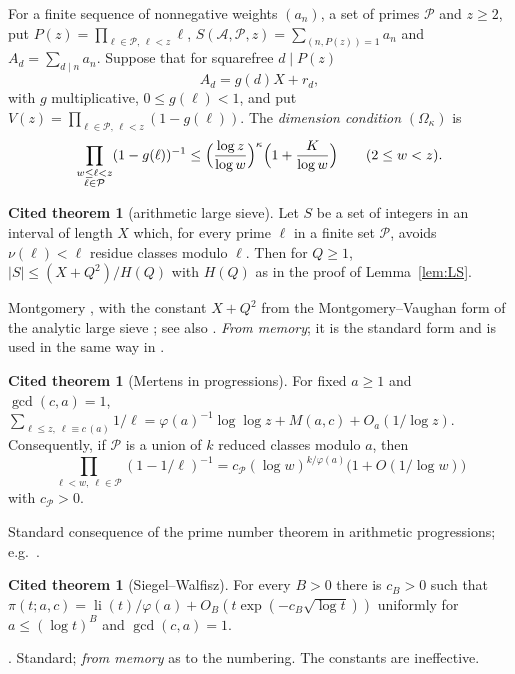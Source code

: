 \documentclass[11pt,reqno]{amsart}
\theoremstyle{definition}
\newtheorem{citedthm}[theorem]{Cited theorem}
\newcommand{\li}{\operatorname{li}}
\begin{document}
For a finite sequence of nonnegative weights $(a_n)$, a set of primes
$\mathcal P$ and $z\ge2$, put $P(z)=\prod_{\ell\in\mathcal P,\,\ell<z}\ell$,
$S(\mathcal A,\mathcal P,z)=\sum_{(n,P(z))=1}a_n$ and
$A_d=\sum_{d\mid n}a_n$.  Suppose that for squarefree $d\mid P(z)$
\begin{equation}\label{eq:sievedata}
 A_d=g(d)X+r_d,
\end{equation}
with $g$ multiplicative, $0\le g(\ell)<1$, and put
$V(z)=\prod_{\ell\in\mathcal P,\,\ell<z}(1-g(\ell))$.  The \emph{dimension
condition} $(\Omega_\kappa)$ is
\[
 \prod_{\substack{w\le\ell<z\\ \ell\in\mathcal P}}(1-g(\ell))^{-1}
 \le\Bigl(\frac{\log z}{\log w}\Bigr)^{\kappa}\Bigl(1+\frac K{\log w}\Bigr)
 \qquad(2\le w<z).
\]

\begin{citedthm}[arithmetic large sieve]\label{cit:LS}
Let $S$ be a set of integers in an interval of length $X$ which, for every
prime $\ell$ in a finite set $\mathcal P$, avoids $\nu(\ell)<\ell$ residue
classes modulo $\ell$.  Then for $Q\ge1$, $|S|\le(X+Q^2)/H(Q)$ with $H(Q)$
as in the proof of Lemma~\ref{lem:LS}.
\end{citedthm}
\noindent Montgomery \cite{Montgomery68}, with the constant $X+Q^2$ from the
Montgomery--Vaughan form of the analytic large sieve \cite{MVLS}; see also
\cite[\S9.4]{OdC}.  \emph{From memory}; it is the standard form and is
used in the same way in \cite[Lemma 12.1]{Notes}.

\begin{citedthm}[Mertens in progressions]\label{cit:mertens}
For fixed $a\ge1$ and $\gcd(c,a)=1$,
$\sum_{\ell\le z,\ \ell\equiv c\,(a)}1/\ell=\varphi(a)^{-1}\log\log z+M(a,c)+O_a(1/\log z)$.
Consequently, if $\mathcal P$ is a union of $k$ reduced classes modulo $a$,
then
\[
 \prod_{\ell<w,\ \ell\in\mathcal P}(1-1/\ell)^{-1}=c_{\mathcal P}(\log w)^{k/\varphi(a)}\bigl(1+O(1/\log w)\bigr)
\]
with $c_{\mathcal P}>0$.
\end{citedthm}
\noindent Standard consequence of the prime number theorem in
arithmetic progressions; e.g.\ \cite[\S4.2]{MV}.

\begin{citedthm}[Siegel--Walfisz]\label{cit:SW}
For every $B>0$ there is $c_B>0$ such that
$\pi(t;a,c)=\li(t)/\varphi(a)+O_B(t\exp(-c_B\sqrt{\log t}))$ uniformly for
$a\le(\log t)^B$ and $\gcd(c,a)=1$.
\end{citedthm}
\noindent \cite[Cor.~11.21]{MV}.  Standard; \emph{from memory} as to the
numbering.  The constants are ineffective.
\end{document}
